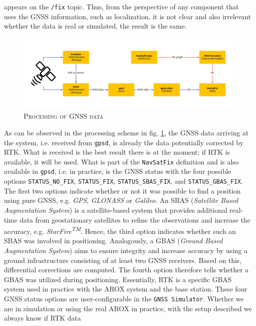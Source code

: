 \documentclass[english, master, utf8]{base/thesis_KBS}
\newcommand{\code}[1]{\colorbox{light-gray}{\texttt{#1}}}
\begin{document}
appears on the \code{/fix} topic. Thus, from the perspective of any component that uses the GNSS information, such as localization, it is not clear and also irrelevant whether the
data is real or simulated, the result is the same.
\begin{figure}[H]
    \centering
    \includegraphics[width=\textwidth]{pics/GNSS_comm.png}
    \caption{\textsc{Processing of GNSS data}}
    \label{fig:gnss_communication}
\end{figure}
\noindent
As can be observed in the processing scheme in fig. \ref{fig:gnss_communication}, the GNSS data arriving at the system,
i.e. received from \code{gpsd}, is already the data potentially corrected by RTK. What is received is the best result there is at the moment; if RTK is available, it will be used.
What is part of the \code{NavSatFix} definition and is also available in \code{gpsd}, i.e. in practice, is the GNSS status with the four possible options \code{STATUS\_NO\_FIX},
\code{STATUS\_FIX}, \code{STATUS\_SBAS\_FIX}, and \code{STATUS\_GBAS\_FIX}. The first two options indicate whether or not it was possible to find a position using pure GNSS, e.g.
\textit{GPS}, \textit{GLONASS} or \textit{Galileo}. An SBAS (\textit{Satellite Based Augmentation System}) is a satellite-based system that provides additional real-time data from geostationary
satellites to refine the observations and increase the accuracy, e.g. \textit{StarFire\textsuperscript{TM}}. \cite{Dixon:2006} Hence, the third option indicates whether such
an SBAS was involved in positioning. Analogously, a GBAS (\textit{Ground Based Augmentation System}) aims to ensure integrity and increase accuracy
by using a ground infrastructure consisting of at least two GNSS receivers. \cite{GNSS_aug} Based on this, differential corrections are computed. The fourth option therefore
tells whether a GBAS was utilized during positioning. Essentially, RTK is a specific GBAS system used in practice with the AROX system and the base station. These four GNSS status
options are user-configurable in the \code{GNSS Simulator}. Whether we are in simulation or using the real AROX in practice, with the setup described we always know if RTK data
\end{document}
